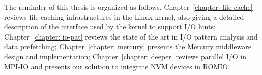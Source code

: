 The reminder of this thesis is organized as follows. Chapter~\ref{chapter: file-cache} reviews file caching infrastructures in the Linux kernel, also giving a detailed description of the interface used by the kernel
to support I/O hints; Chapter~\ref{chapter: io-pat} reviews the state of the art in I/O pattern analysis and data prefetching; Chapter~\ref{chapter: mercury} presents the Mercury middleware design and implementation;
Chapter~\ref{chapter: deeper} reviews parallel I/O in MPI-IO and presents our solution to integrate NVM devices in ROMIO.

%
%

